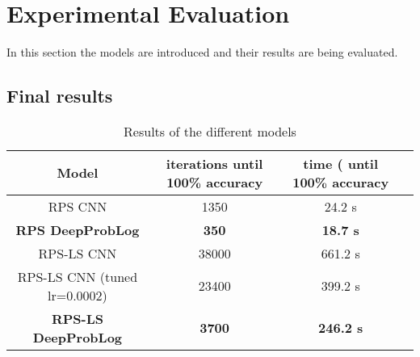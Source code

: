 \section{Experimental Evaluation}
In this section the models are introduced and their results are being evaluated.






\subsection{Final results}


\begin{table}[!h]
    \centering
    \begin{tabular}{|c|c|c|c|}
        \hline
        Model & iterations until 100\% accuracy  & time ( until 100\% accuracy    \\
        \hline\hline
        RPS CNN & 1350 & 24.2 s \\
        \hline
        \textbf{RPS DeepProbLog} & \textbf{350} & \textbf{18.7 s} \\
        \hline
        \hline
        RPS-LS CNN & 38000 & 661.2 s\\
        \hline
        RPS-LS CNN (tuned lr=0.0002)& 23400 & 399.2 s\\
        \hline
        \textbf{RPS-LS DeepProbLog} & \textbf{3700} & \textbf{246.2 s}\\
        \hline
    \end{tabular}
    \caption{Results of the different models}
    \label{t1}
    \end{table}